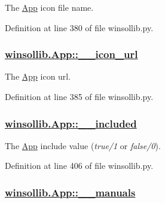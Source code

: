 The \hyperlink{classwinsollib_1_1App}{App} icon file name. 



Definition at line 380 of file winsollib.py.\hypertarget{classwinsollib_1_1App_b45d604f6fe1e467838c367008a509cc}{
\subsubsection[\_\-\_\-icon\_\-url]{\setlength{\rightskip}{0pt plus 5cm}\hyperlink{classwinsollib_1_1App_b45d604f6fe1e467838c367008a509cc}{winsollib.App::\_\-\_\-icon\_\-url}}}
\label{classwinsollib_1_1App_b45d604f6fe1e467838c367008a509cc}


The \hyperlink{classwinsollib_1_1App}{App} icon url. 



Definition at line 385 of file winsollib.py.\hypertarget{classwinsollib_1_1App_20a0fca37c2b4af23ff9e3201b3a3fc2}{
\subsubsection[\_\-\_\-included]{\setlength{\rightskip}{0pt plus 5cm}\hyperlink{classwinsollib_1_1App_20a0fca37c2b4af23ff9e3201b3a3fc2}{winsollib.App::\_\-\_\-included}}}
\label{classwinsollib_1_1App_20a0fca37c2b4af23ff9e3201b3a3fc2}


The \hyperlink{classwinsollib_1_1App}{App} include value ({\em true/1\/} or {\em false/0\/}). 



Definition at line 406 of file winsollib.py.\hypertarget{classwinsollib_1_1App_1af4cfd72ef4f2e4ce69304a2aa34b5f}{
\subsubsection[\_\-\_\-manuals]{\setlength{\rightskip}{0pt plus 5cm}\hyperlink{classwinsollib_1_1App_1af4cfd72ef4f2e4ce69304a2aa34b5f}{winsollib.App::\_\-\_\-manuals}}}
\label{classwinsollib_1_1App_1af4cfd72ef4f2e4ce69304a2aa34b5f}



